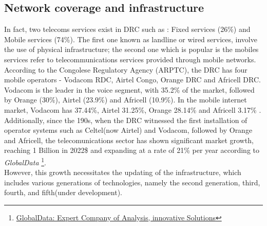\documentclass[12pt,a4paper, oneside]{book}
\begin{document}
	   \subsection{Network coverage and infrastructure}   
	    In fact, two telecoms services exist in DRC such as : Fixed services (26\%) and Mobile services (74\%). The first one known as landline or wired services, involve the use of physical infrastructure; the second one which is popular is the mobiles services refer to telecommunications services provided through mobile networks.
	    According to the Congolese Regulatory Agency (ARPTC), the DRC has four mobile operators - Vodacom RDC,
	    Airtel Congo, Orange DRC and Africell DRC. Vodacom is the leader in the voice segment, with 35.2\% of the market,
	    followed by Orange (30\%), Airtel (23.9\%) and Africell (10.9\%). In the mobile internet market, Vodacom has 37.44\%, Airtel
	    31.25\%, Orange 28.14\% and Africell 3.17\% \citep{stateInternet2019}. \\
	     	     	        
	   Additionally, since the 190s, when the DRC witnessed the first installation of operator systems such as Celtel(now Airtel) and Vodacom, followed by Orange and Africell, the telecomunications sector has shown significant market growth, reaching 1 Billion in 2022\$ and expanding at a rate of 21\% per year according to  \textit{GlobalData} \footnote{\href{https://www.globaldata.com/store/report/drc-telecom-operators-market-analysis/}{GlobalData: Expert Company of Analysis, innovative Solutions}}. \\
	   
	   However, this growth necessitates the updating of the infrastructure, which includes various generations of technologies, namely the second generation, third, fourth, and fifth(under development).\\
	   	   
\end{document}
